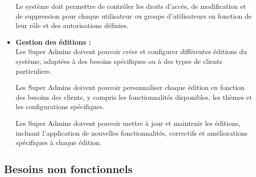 \begin{itemize}
        Le système doit permettre de contrôler les droits d'accès, de modification et de suppression pour chaque utilisateur ou groupe d'utilisateurs en fonction de leur rôle et des autorisations définies.

  \item \textbf{Gestion des éditions :}\\
        Les Super Admins doivent pouvoir créer et configurer différentes éditions du système, adaptées à des besoins spécifiques ou à des types de clients particuliers.

        Les Super Admins doivent pouvoir personnaliser chaque édition en fonction des besoins des clients, y compris les fonctionnalités disponibles, les thèmes et les configurations spécifiques.

        Les Super Admins doivent pouvoir mettre à jour et maintenir les éditions, incluant l'application de nouvelles fonctionnalités, correctifs et améliorations spécifiques à chaque édition.

\end{itemize}



\subsection{Besoins non fonctionnels}

